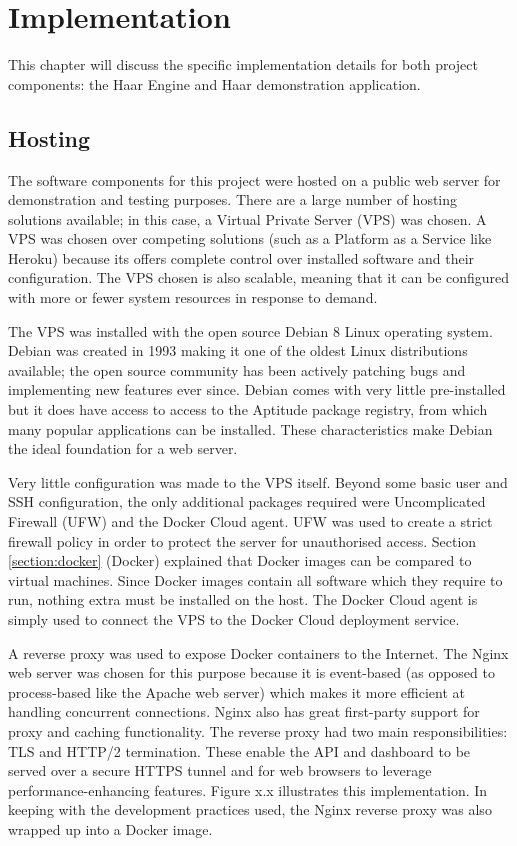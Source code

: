\chapter{Implementation}
  This chapter will discuss the specific implementation details for both project components: the Haar Engine and Haar demonstration application.


  \section{Hosting}
    The software components for this project were hosted on a public web server for demonstration and testing purposes. There are a large number of hosting solutions available; in this case, a Virtual Private Server (VPS) was chosen. A VPS was chosen over competing solutions (such as a Platform as a Service like Heroku) because its offers complete control over installed software and their configuration. The VPS chosen is also scalable, meaning that it can be configured with more or fewer system resources in response to demand.

    The VPS was installed with the open source Debian 8 Linux operating system. Debian was created in 1993 making it one of the oldest Linux distributions available; the open source community has been actively patching bugs and implementing new features ever since. Debian comes with very little pre-installed but it does have access to access to the Aptitude package registry, from which many popular applications can be installed. These characteristics make Debian the ideal foundation for a web server.

    Very little configuration was made to the VPS itself. Beyond some basic user and SSH configuration, the only additional packages required were Uncomplicated Firewall (UFW) and the Docker Cloud agent. UFW was used to create a strict firewall policy in order to protect the server for unauthorised access. Section \ref{section:docker} (Docker) explained that Docker images can be compared to virtual machines. Since Docker images contain all software which they require to run, nothing extra must be installed on the host. The Docker Cloud agent is simply used to connect the VPS to the Docker Cloud deployment service.

    A reverse proxy was used to expose Docker containers to the Internet. The Nginx web server was chosen for this purpose because it is event-based (as opposed to process-based like the Apache web server) which makes it more efficient at handling concurrent connections. Nginx also has great first-party support for proxy and caching functionality. The reverse proxy had two main responsibilities: TLS and HTTP/2 termination. These enable the API and dashboard to be served over a secure HTTPS tunnel and for web browsers to leverage performance-enhancing features. Figure x.x illustrates this implementation. In keeping with the development practices used, the Nginx reverse proxy was also wrapped up into a Docker image.

